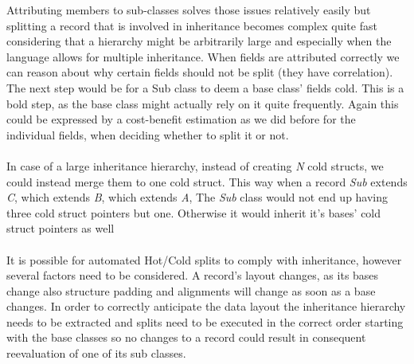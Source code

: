 Attributing members to sub-classes solves those issues relatively easily but splitting a record that is involved in inheritance becomes complex quite fast considering that a hierarchy might be arbitrarily large and especially when the language allows for multiple inheritance. When fields are attributed correctly we can reason about why certain fields should not be split (they have correlation). The next step would be for a Sub class to deem a base class' fields cold. This is a bold step, as the base class might actually rely on it quite frequently. Again this could be expressed by a cost-benefit estimation as we did before for the individual fields, when deciding whether to split it or not.\\\\
In case of a large inheritance hierarchy, instead of creating \textit{N} cold structs, we could instead merge them to one cold struct. This way when a record \textit{Sub} extends \textit{C}, which extends \textit{B}, which extends \textit{A}, The \textit{Sub} class would not end up having three cold struct pointers but one. Otherwise it would inherit it's bases' cold struct pointers as well\\\\
It is possible for automated Hot/Cold splits to comply with inheritance, however several factors need to be considered. A record's layout changes, as its bases change also structure padding and alignments will change as soon as a base changes. In order to correctly anticipate the data layout the inheritance hierarchy needs to be extracted and splits need to be executed in the correct order starting with the base classes so no changes to a record could result in consequent reevaluation of one of its sub classes.

